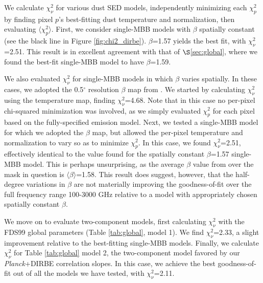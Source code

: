 \documentclass{emulateapj}
\newcommand{\PLANCK}{{\it Planck}}
\begin{document}
We calculate $\chi^2_{\nu}$ for various dust SED models, independently 
minimizing each $\chi^2_p$ by finding pixel $p$'s best-fitting dust 
temperature and normalization, then evaluating $\langle \chi_{p}^2 \rangle$. 
First, we consider single-MBB models with $\beta$ spatially constant (see the
black line in Figure \ref{fig:chi2_dirbe}). $\beta$=1.57 yields the best fit, 
with $\chi^2_{\nu}$=2.51. This result is in excellent agreement with that of 
$\S$\ref{sec:global}, where we found the best-fit single-MBB model to have 
$\beta$=1.59. 

We also evaluated $\chi^2_{\nu}$ for single-MBB models in which
$\beta$ varies spatially. In these cases, we adopted the 0.5$^{\circ}$ 
resolution $\beta$ map from \cite{planckdust}. We started by calculating 
$\chi^2_{\nu}$ using the \cite{planckdust} temperature map, finding 
$\chi^2_{\nu}$=4.68. Note that in this case no per-pixel chi-squared 
minimization was involved, as we simply evaluated $\chi^2_{p}$ for each pixel 
based on the fully-specified \cite{planckdust} emission model. Next, we tested 
a single-MBB model for which we adopted the \cite{planckdust} $\beta$ map, but 
allowed the per-pixel temperature and normalization to vary so as to minimize 
$\chi^2_p$. In this case, we found $\chi^2_{\nu}$=2.51, effectively identical 
to the value found for the spatially constant $\beta$=1.57 single-MBB model. 
This is perhaps unsurprising, as the average $\beta$ value from 
\cite{planckdust} over the mask in question is $\langle\beta\rangle$=1.58. 
This result does suggest, however, that the half-degree variations in $\beta$ 
are not materially improving the goodness-of-fit over the full frequency range 
100-3000 GHz relative to a model with appropriately chosen spatially constant 
$\beta$.


We move on to evaluate two-component models, first calculating $\chi^2_{\nu}$ 
with the FDS99 global parameters (Table \ref{tab:global}, model 1). We find
$\chi^2_{\nu}$=2.33, a slight improvement relative to the best-fitting
single-MBB models. Finally, we calculate $\chi^2_{\nu}$ for Table 
\ref{tab:global} model 2, the two-component model favored by our \PLANCK+DIRBE 
correlation slopes. In this case, we achieve the best goodness-of-fit out of 
all the models we have tested, with $\chi^2_{\nu}$=2.11.
\end{document}
